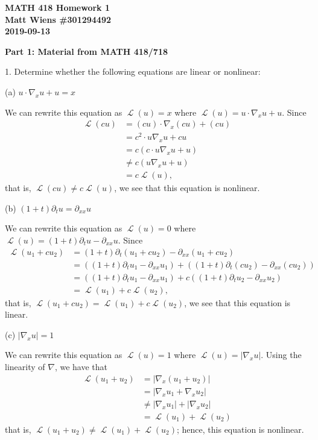 \documentclass{article}
\DeclareMathOperator{\Lagr}{\mathcal{L}}
\begin{document}
\textbf{MATH 418 Homework 1} \\
\textbf{Matt Wiens \#301294492} \\
\textbf{2019-09-13}

\textbf{Part 1: Material from MATH 418/718}

1. Determine whether the following equations are linear or nonlinear:

(a) $u \cdot \nabla_{x} u + u = x$

We can rewrite this equation as $\Lagr(u) = x$ where
$\Lagr(u) = u \cdot \nabla_{x} u + u$. Since
%
\begin{align*}
    \Lagr(c u)
        &= (c u) \cdot \nabla_x (c u) + (c u) \\
        &= c^2 \cdot u \nabla_x u + c u \\
        &= c \left(c \cdot u \nabla_x u + u \right) \\
        &\neq c \left(u \nabla_x u + u \right) \\
        &= c \Lagr(u),
\end{align*}
%
that is, $\Lagr(c u) \neq c \Lagr(u)$, we see that this equation is nonlinear.

(b) $(1 + t) \partial_{t} u = \partial_{x x} u$

We can rewrite this equation as $\Lagr(u) = 0$ where
$\Lagr(u) = (1 + t) \partial_{t} u - \partial_{x x} u$. Since
%
\begin{align*}
    \Lagr(u_1 + c u_2)
        &= (1 + t) \partial_{t} (u_1 + c u_2) - \partial_{x x} (u_1 + c u_2) \\
        &= \left( (1 + t) \partial_{t} u_1 - \partial_{x x} u_1 \right)
           + \left( (1 + t) \partial_{t} (c u_2) -  \partial_{x x} (c u_2) \right) \\
        &= \left( (1 + t) \partial_{t} u_1 - \partial_{x x} u_1 \right)
           + c \left( (1 + t) \partial_{t} u_2 -  \partial_{x x} u_2 \right) \\
        &= \Lagr(u_1) + c \Lagr(u_2),
\end{align*}
%
that is, $\Lagr(u_1 + c u_2) = \Lagr(u_1) + c \Lagr(u_2)$, we see that
this equation is linear.

(c) $\left| \nabla_{x} u \right| = 1$

We can rewrite this equation as $\Lagr(u) = 1$ where
$\Lagr(u) = \left| \nabla_{x} u \right|$. Using the linearity of
$\nabla$, we have that
%
\begin{align*}
    \Lagr(u_1 + u_2)
        &= \left| \nabla_{x} (u_1 + u_2) \right| \\
        &= \left| \nabla_{x} u_1 + \nabla_{x} u_2 \right| \\
        &\neq \left| \nabla_{x} u_1 \right| + \left| \nabla_{x} u_2 \right| \\
        &= \Lagr(u_1) + \Lagr(u_2)
\end{align*}
%
that is, $\Lagr(u_1 + u_2) \neq \Lagr(u_1) + \Lagr(u_2)$; hence, this equation is nonlinear.
\end{document}
